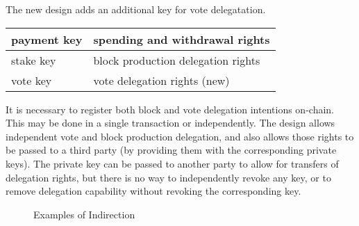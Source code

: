 The new design adds an additional key for vote delegatation.

\begin{center}
  \begin{tabular}{||l|l||}
\hline\hline
  payment key & spending and withdrawal rights \\\hline
  stake key & block production delegation rights \\\hline
  vote key & vote delegation rights (new) \\
\hline\hline
\end{tabular}
\end{center}

It is necessary to register both block and vote delegation intentions on-chain.  This may be done in a single transaction or independently.
The design allows independent vote and block production delegation, and also allows those rights to be passed to a third party (by providing them
with the corresponding private keys).  
The private key can be passed to another party to allow for transfers of delegation rights, but there is no way to independently revoke any key, or to remove
delegation capability without revoking the corresponding key.  

\begin{figure*}[h]
  \caption{Examples of Indirection}
\end{figure*}
